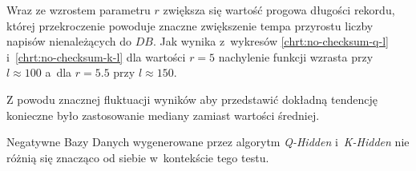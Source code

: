 Wraz ze wzrostem parametru $r$ zwiększa się wartość progowa długości rekordu, której przekroczenie powoduje znaczne zwiększenie tempa przyrostu liczby napisów nienależących do $DB$.
Jak wynika z~wykresów \ref{chrt:no-checksum-q-l} i~\ref{chrt:no-checksum-k-l} dla wartości $r=5$ nachylenie funkcji wzrasta przy $l \approx 100$ a~dla $r=5.5$ przy $l \approx 150$.

Z powodu znacznej fluktuacji wyników aby przedstawić dokładną tendencję konieczne było zastosowanie mediany zamiast wartości średniej. 

Negatywne Bazy Danych wygenerowane przez algorytm \textit{Q-Hidden} i~\textit{K-Hidden} nie różnią się znacząco od siebie w~kontekście tego testu.

